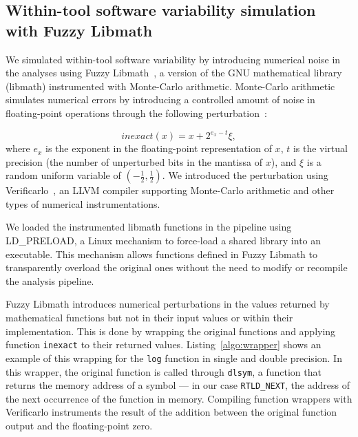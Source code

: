 \subsection{Within-tool software variability simulation with Fuzzy Libmath}

We simulated within-tool software variability by introducing 
numerical noise in the analyses using
Fuzzy Libmath~\cite{salari2021accurate}, a version of the GNU
mathematical library (libmath) instrumented with Monte-Carlo arithmetic.
Monte-Carlo arithmetic simulates numerical errors
by introducing a controlled amount of noise in floating-point
operations through the following perturbation~\cite{Parker1997-qq}:

\begin{equation} \label{eq:mca_inexact}
  inexact(x) = x + 2^{e_x-t}\xi,
\end{equation}
where $e_x$ is the exponent in the floating-point representation of $x$,
$t$ is the virtual precision (the number of unperturbed bits in the
mantissa of $x$), and $\xi$ is a random uniform variable of
$(-\frac{1}{2}, \frac{1}{2})$. We introduced the perturbation using
Verificarlo~\cite{denis2015verificarlo}, an LLVM compiler supporting Monte-Carlo
arithmetic and other types of numerical instrumentations.

We loaded the instrumented libmath functions in the pipeline using
LD\_PRELOAD, a Linux mechanism to force-load a shared library into an
executable. This mechanism allows functions defined in Fuzzy Libmath to transparently
overload the original ones without the need to modify or recompile the
analysis pipeline.

Fuzzy Libmath introduces numerical perturbations in the values returned by
mathematical functions but not in their input values or within their
implementation. This is done by wrapping the original functions and
applying function \texttt{inexact} to their returned values.
Listing~\ref{algo:wrapper} shows an example of this wrapping for the
\texttt{log} function in single and double precision. In this wrapper, the
original function is called through \texttt{dlsym}, a function that returns
the memory address of a symbol --- in our case \texttt{RTLD\_NEXT}, the
address of the next occurrence of the function in memory. Compiling function wrappers
with Verificarlo instruments the result of the
addition between the original function output and the floating-point zero.



